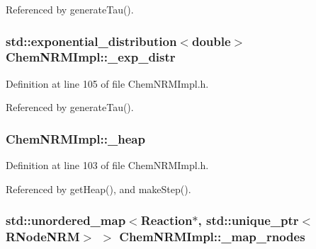 Referenced by generate\-Tau().

\hypertarget{classChemNRMImpl_a3ed1674d931e47c51ee79fb967ad4e16}{
\subsubsection[{\-\_\-exp\-\_\-distr}]{\setlength{\rightskip}{0pt plus 5cm}std\-::exponential\-\_\-distribution$<$double$>$ {\bf Chem\-N\-R\-M\-Impl\-::\-\_\-exp\-\_\-distr}}}\label{classChemNRMImpl_a3ed1674d931e47c51ee79fb967ad4e16}


Definition at line 105 of file Chem\-N\-R\-M\-Impl.\-h.



Referenced by generate\-Tau().

\hypertarget{classChemNRMImpl_aae97d56d3951afd82e9d017762eeec62}{
\subsubsection[{\-\_\-heap}]{ {\bf Chem\-N\-R\-M\-Impl\-::\-\_\-heap}}}\label{classChemNRMImpl_aae97d56d3951afd82e9d017762eeec62}


Definition at line 103 of file Chem\-N\-R\-M\-Impl.\-h.



Referenced by get\-Heap(), and make\-Step().

\hypertarget{classChemNRMImpl_abb68c12e3b656ee4ee46c19be079b80f}{
\subsubsection[{\-\_\-map\-\_\-rnodes}]{\setlength{\rightskip}{0pt plus 5cm}std\-::unordered\-\_\-map$<${\bf Reaction}$\ast$, std\-::unique\-\_\-ptr$<${\bf R\-Node\-N\-R\-M}$>$ $>$ {\bf Chem\-N\-R\-M\-Impl\-::\-\_\-map\-\_\-rnodes}}}\label{classChemNRMImpl_abb68c12e3b656ee4ee46c19be079b80f}


